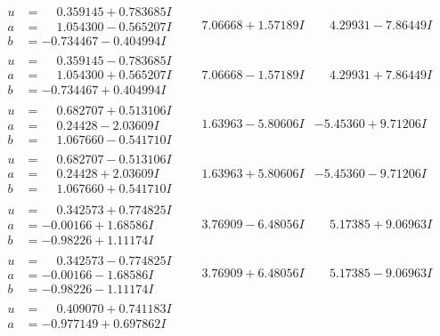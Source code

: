 \documentclass[1p]{elsarticle_modified}
\theoremstyle{definition}
\begin{document}
$$\begin{array}{c|c|c}
\begin{aligned}
u &= \phantom{-}0.359145 + 0.783685 I \\
a &= \phantom{-}1.054300 - 0.565207 I \\
b &= -0.734467 - 0.404994 I\end{aligned}
 & \phantom{-}7.06668 + 1.57189 I & \phantom{-}4.29931 - 7.86449 I \\ \hline\begin{aligned}
u &= \phantom{-}0.359145 - 0.783685 I \\
a &= \phantom{-}1.054300 + 0.565207 I \\
b &= -0.734467 + 0.404994 I\end{aligned}
 & \phantom{-}7.06668 - 1.57189 I & \phantom{-}4.29931 + 7.86449 I \\ \hline\begin{aligned}
u &= \phantom{-}0.682707 + 0.513106 I \\
a &= \phantom{-}0.24428 - 2.03609 I \\
b &= \phantom{-}1.067660 - 0.541710 I\end{aligned}
 & \phantom{-}1.63963 - 5.80606 I & -5.45360 + 9.71206 I \\ \hline\begin{aligned}
u &= \phantom{-}0.682707 - 0.513106 I \\
a &= \phantom{-}0.24428 + 2.03609 I \\
b &= \phantom{-}1.067660 + 0.541710 I\end{aligned}
 & \phantom{-}1.63963 + 5.80606 I & -5.45360 - 9.71206 I \\ \hline\begin{aligned}
u &= \phantom{-}0.342573 + 0.774825 I \\
a &= -0.00166 + 1.68586 I \\
b &= -0.98226 + 1.11174 I\end{aligned}
 & \phantom{-}3.76909 - 6.48056 I & \phantom{-}5.17385 + 9.06963 I \\ \hline\begin{aligned}
u &= \phantom{-}0.342573 - 0.774825 I \\
a &= -0.00166 - 1.68586 I \\
b &= -0.98226 - 1.11174 I\end{aligned}
 & \phantom{-}3.76909 + 6.48056 I & \phantom{-}5.17385 - 9.06963 I \\ \hline\begin{aligned}
u &= \phantom{-}0.409070 + 0.741183 I \\
a &= -0.977149 + 0.697862 I \\

\end{aligned}
\end{array}$$
\end{document}
